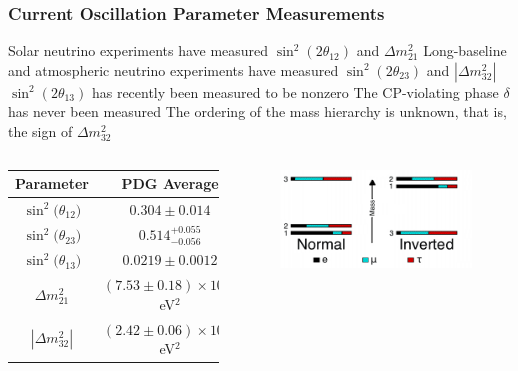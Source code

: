 \documentclass[10pt,professionalfonts,xcolor=table]{beamer}
\begin{document}
\frame
{
  \frametitle{Current Oscillation Parameter Measurements}
    \begin{itemize}
   \bang Solar neutrino experiments have measured $\sin^2(2 \theta_{12}) $ and $\Delta m_{21}^2$
   \bang Long-baseline and atmospheric  neutrino experiments have measured $\sin^2(2 \theta_{23}) $ and $|\Delta m_{32}^2|$
   \bang $\sin^2(2 \theta_{13})$ has recently been measured to be nonzero
\bang The CP-violating phase $\delta$ has never been measured
\bang The ordering of the mass hierarchy is unknown, that is, the sign of $\Delta m_{32}^2$
\end{itemize}
\begin{columns}[c]
 \footnotesize
\centering
\begin{tabular}{ c |  c }
Parameter & PDG Average\footnotemark \\  \hline
  $\sin^2\big(\theta_{12}\big)$&$  0.304 \pm0.014$  \\
  $\sin^2\big(\theta_{23}\big)$&$  0.514_{-0.056}^{+0.055}                  $   \\
  $\sin^2\big( \theta_{13}\big)$&$  0.0219 \pm0.0012$  \\
    $\Delta m^2_{21}       $&$ (7.53 \pm 0.18) \times 10^{-5}$ eV${}^2$ \\
  $|\Delta m^2_{32}|       $&$ (2.42 \pm 0.06 ) \times 10^{-3}$ eV${}^2$  \\
\end{tabular}
 \begin{figure} \includegraphics[width=\textwidth]{figures/figures/hierarchy.jpg} \end{figure}
 \vspace{8pt}
\end{columns}
}
\end{document}
